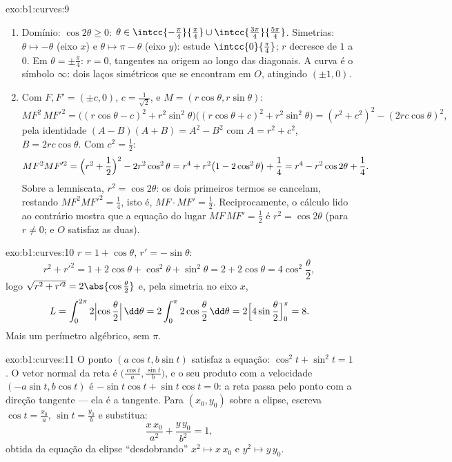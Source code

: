 \begin{solution}{exo:b1:curves:9}
\begin{enumerate}
  \item Domínio: $\cos 2\theta \geq 0$: $\theta \in
        \intcc{-\frac\pi4}{\frac\pi4} \cup
        \intcc{\frac{3\pi}{4}}{\frac{5\pi}{4}}$. Simetrias: $\theta
        \mapsto -\theta$ (eixo $x$) e $\theta \mapsto \pi -
        \theta$
        (eixo $y$): estude $\intcc{0}{\frac\pi4}$; $r$ decresce de $1$ a $0$. Em
        $\theta = \pm\frac\pi4$: $r =
        0$, tangentes na origem ao longo das diagonais. A
        curva é o símbolo $\infty$: dois laços simétricos que se
        encontram em $O$, atingindo $(\pm 1, 0)$.
  \item Com $F, F' = (\pm c, 0)$, $c = \frac{1}{\sqrt 2}$, e $M
        = (r\cos\theta, r\sin\theta)$:
        \[
        MF^2\, MF'^2
        = \bigl((r\cos\theta - c)^2 + r^2\sin^2\theta\bigr)
        \bigl((r\cos\theta + c)^2 + r^2\sin^2\theta\bigr)
        = (r^2 + c^2)^2 - (2rc\cos\theta)^2 ,
        \]
        pela identidade $(A - B)(A + B) = A^2 - B^2$ com $A = r^2
        + c^2$, $B = 2rc\cos\theta$. Com $c^2 = \frac12$:
        \[
        MF^2 MF'^2 = \Bigl(r^2 + \frac12\Bigr)^2 - 2r^2\cos^2\theta
        = r^4 + r^2\bigl(1 - 2\cos^2\theta\bigr) + \frac14
        = r^4 - r^2\cos 2\theta + \frac14 .
        \]
        Sobre a lemniscata, $r^2 = \cos 2\theta$: os dois primeiros termos se
        cancelam, restando $MF^2MF'^2 = \frac14$, isto é, $MF \cdot MF' =
        \frac12$. Reciprocamente, o
        cálculo lido ao contrário mostra que a equação do lugar $MF\,MF' = \frac12$
        é $r^2 = \cos
        2\theta$ (para $r \neq 0$; e $O$ satisfaz as duas).
\end{enumerate}
\end{solution}

\begin{solution}{exo:b1:curves:10}
$r = 1 + \cos\theta$, $r' = -\sin\theta$:
\[
r^2 + r'^2 = 1 + 2\cos\theta + \cos^2\theta + \sin^2\theta
= 2 + 2\cos\theta = 4\cos^2\frac\theta2 ,
\]
logo $\sqrt{r^2 + r'^2} = 2\abs{\cos\frac\theta2}$ e, pela simetria no eixo $x$,
\[
L = \int_0^{2\pi} 2\Bigl|\cos\frac\theta2\Bigr|\,\dd\theta
= 2\int_0^{\pi} 2\cos\frac\theta2\,\dd\theta
= 2\Bigl[4\sin\frac\theta2\Bigr]_0^{\pi} = 8 .
\]
Mais um perímetro algébrico, sem $\pi$.
\end{solution}

\begin{solution}{exo:b1:curves:11}
O ponto $(a\cos t, b\sin t)$ satisfaz a equação: $\cos^2 t + \sin^2 t = 1$. O vetor normal da reta é
$\bigl(\frac{\cos t}a, \frac{\sin t}b\bigr)$, e o seu produto com a velocidade $(-a\sin t, b\cos t)$ é $-\sin t\cos t +
\sin t\cos t = 0$: a reta passa
pelo ponto com a direção tangente --- ela é a tangente. Para $(x_0, y_0)$
sobre a elipse, escreva $\cos t = \frac{x_0}a$, $\sin t = \frac{y_0}b$ e substitua:
\[
\frac{x\,x_0}{a^2} + \frac{y\,y_0}{b^2} = 1 ,
\]
obtida da equação da elipse ``desdobrando'' $x^2 \mapsto
x\,x_0$ e $y^2 \mapsto y\,y_0$.
\end{solution}

